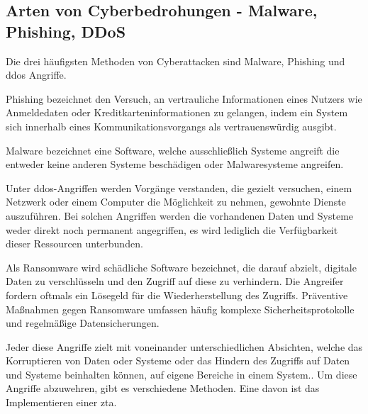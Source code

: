 \subsection[Arten von Cyberbedrohungen]{Arten von Cyberbedrohungen - Malware, Phishing, DDoS}\label{subsec:arten-von-cyberbedrohungen---malware-phishing-ddos}

Die drei häufigsten Methoden von Cyberattacken sind Malware, Phishing und \ac{ddos} Angriffe.

\begin{definition}
    \label{def:phishing}
    Phishing bezeichnet den Versuch, an vertrauliche Informationen eines Nutzers wie Anmeldedaten oder Kreditkarteninformationen zu gelangen, indem ein System sich innerhalb eines Kommunikationsvorgangs als vertrauenswürdig ausgibt.\autocite[\vglf][]{study-on-phishing-attacks:2018}
\end{definition}

\begin{definition}
    \label{def:malware}
    Malware bezeichnet eine Software, welche ausschließlich Systeme angreift die entweder keine anderen Systeme beschädigen oder Malwaresysteme angreifen.\autocite[\vglf][\pagef 108f.]{definition-malware-2010}
\end{definition}

\begin{definition}
    \label{def:ddos}
    Unter \ac{ddos}-Angriffen werden Vorgänge verstanden, die gezielt versuchen, einem Netzwerk oder einem Computer die Möglichkeit zu nehmen, gewohnte Dienste auszuführen.
    Bei solchen Angriffen werden die vorhandenen Daten und Systeme weder direkt noch permanent angegriffen, es wird lediglich die Verfügbarkeit dieser Ressourcen unterbunden.\autocite[\vglf][]{ddos-definition-2003}
\end{definition}

\begin{definition}
    \label{def:ransomware}
    Als Ransomware wird schädliche Software bezeichnet, die darauf abzielt, digitale Daten zu verschlüsseln und den Zugriff auf diese zu verhindern.
    Die Angreifer fordern oftmals ein Lösegeld für die Wiederherstellung des Zugriffs.
    Präventive Maßnahmen gegen Ransomware umfassen häufig komplexe Sicherheitsprotokolle und regelmäßige Datensicherungen.
\end{definition}

Jeder diese Angriffe zielt mit voneinander unterschiedlichen Absichten, welche das Korruptieren von Daten oder Systeme oder das Hindern des Zugriffs auf Daten und Systeme beinhalten können, auf eigene Bereiche in einem System..
Um diese Angriffe abzuwehren, gibt es verschiedene Methoden.
Eine davon ist das Implementieren einer \ac{zta}.

